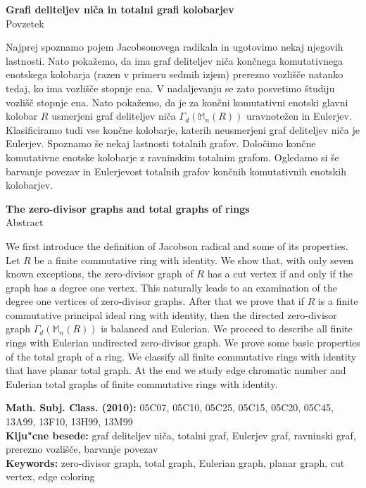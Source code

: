 \documentclass[a4paper, 12pt]{amsart}
\theoremstyle{definition} %
\theoremstyle{plain} %
\newcommand{\M}{\mathbb M}
\newcommand{\naslovdela}{Grafi deliteljev niča in totalni grafi kolobarjev}
\begin{document}
\thispagestyle{empty}
\begin{center}
{\bf \naslovdela}\\[3mm]
{\sc Povzetek}
\end{center}
Najprej spoznamo pojem Jacobsonovega radikala in ugotovimo nekaj njegovih lastnosti. Nato pokažemo, da ima graf deliteljev niča končnega komutativnega enotskega kolobarja (razen v primeru sedmih izjem) prerezno vozlišče natanko tedaj, ko ima vozlišče stopnje ena. V nadaljevanju se zato posvetimo študiju vozlišč stopnje ena. Nato pokažemo, da je za končni komutativni enotski glavni kolobar $R$ usmerjeni graf deliteljev niča $\Gamma_d(\M_n(R))$ uravnotežen in Eulerjev. Klasificiramo tudi vse končne kolobarje, katerih neusmerjeni graf deliteljev niča je Eulerjev. Spoznamo še nekaj lastnosti totalnih grafov. Določimo končne komutativne enotske kolobarje z ravninskim totalnim grafom. Ogledamo si še barvanje povezav in Eulerjevost totalnih grafov končnih komutativnih enotskih kolobarjev.
\vfill
\begin{center}
{\bf The zero-divisor graphs and total graphs of rings }\\[3mm] %
{\sc Abstract}
\end{center}
We first introduce the definition of Jacobson radical and some of its properties. Let $R$ be a finite commutative ring with identity. We show that, with only seven known exceptions, the zero-divisor graph of $R$ has a cut vertex if and only if the graph has a degree one vertex. This naturally leads to an examination of the degree one vertices of zero-divisor graphs. After that we prove that if $R$ is a finite commutative principal ideal ring with identity, then the directed  zero-divisor graph $\Gamma_d(\M_n(R))$ is balanced and Eulerian. We proceed to describe all finite rings with Eulerian undirected zero-divisor graph. We prove some basic properties of the total graph of a ring. We classify all finite commutative rings with identity that have planar total graph. At the end we study edge chromatic number and Eulerian total graphs of finite commutative rings with identity.

\vfill\noindent
{\bf Math. Subj. Class. (2010):} 05C07, 05C10, 05C25, 05C15, 05C20, 05C45, 13A99, 13F10, 13H99, 13M99  \\[1mm]  
{\bf Klju"cne besede:} graf deliteljev niča, totalni graf,  Eulerjev graf, ravninski graf, prerezno vozlišče, barvanje povezav
 \\[1mm]  
{\bf Keywords:} zero-divisor graph, total graph, Eulerian graph, planar graph, cut vertex, edge coloring 
\pagebreak
\end{document}
